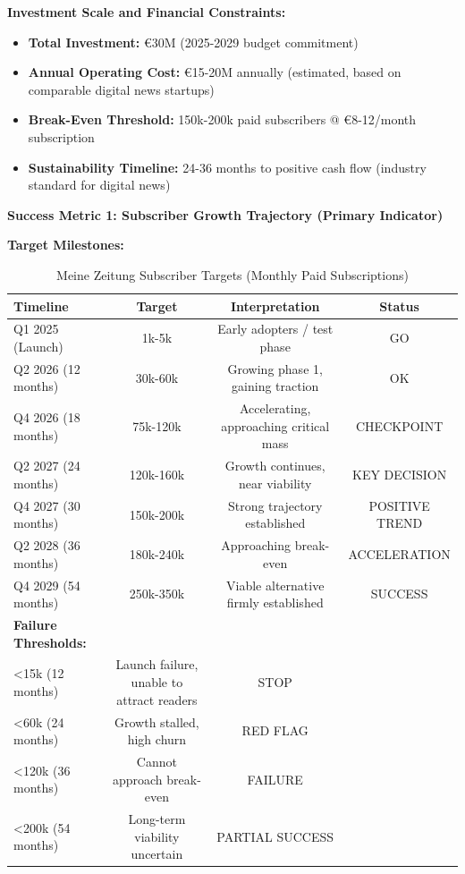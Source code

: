 \textbf{Investment Scale and Financial Constraints:}

\begin{itemize}
\item \textbf{Total Investment:} €30M (2025-2029 budget commitment)
\item \textbf{Annual Operating Cost:} €15-20M annually (estimated, based on comparable digital news startups)
\item \textbf{Break-Even Threshold:} 150k-200k paid subscribers @ €8-12/month subscription
\item \textbf{Sustainability Timeline:} 24-36 months to positive cash flow (industry standard for digital news)
\end{itemize}

\textbf{Success Metric 1: Subscriber Growth Trajectory (Primary Indicator)}

\textbf{Target Milestones:}

\begin{table}[h]
\centering
\caption{Meine Zeitung Subscriber Targets (Monthly Paid Subscriptions)}
\label{tab:dx-meine-zeitung-subs}
\begin{tabular}{|l|c|c|c|}
\hline
\textbf{Timeline} & \textbf{Target} & \textbf{Interpretation} & \textbf{Status} \\
\hline
Q1 2025 (Launch) & 1k-5k & Early adopters / test phase & GO \\
Q2 2026 (12 months) & 30k-60k & Growing phase 1, gaining traction & OK \\
Q4 2026 (18 months) & 75k-120k & Accelerating, approaching critical mass & CHECKPOINT \\
Q2 2027 (24 months) & 120k-160k & Growth continues, near viability & KEY DECISION \\
Q4 2027 (30 months) & 150k-200k & Strong trajectory established & POSITIVE TREND \\
Q2 2028 (36 months) & 180k-240k & Approaching break-even & ACCELERATION \\
Q4 2029 (54 months) & 250k-350k & Viable alternative firmly established & SUCCESS \\
\hline
\textbf{Failure Thresholds:} & & & \\
<15k (12 months) & Launch failure, unable to attract readers & STOP \\
<60k (24 months) & Growth stalled, high churn & RED FLAG \\
<120k (36 months) & Cannot approach break-even & FAILURE \\
<200k (54 months) & Long-term viability uncertain & PARTIAL SUCCESS \\
\hline
\end{tabular}
\end{table}

